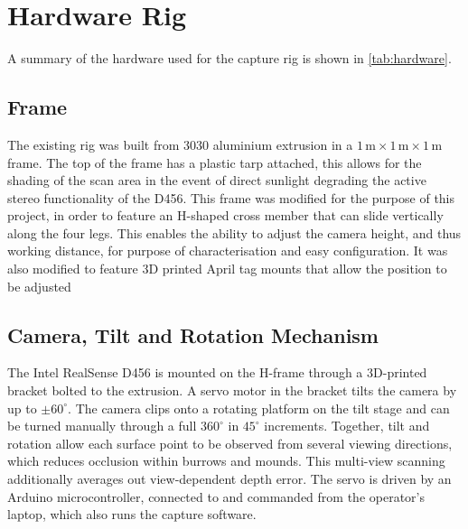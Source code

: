 \section{Hardware Rig}
\label{sec:4.3-Hardware-Rig}
A summary of the hardware used for the capture rig is shown in \autoref{tab:hardware}.
\subsection{Frame}

The existing rig was built from 3030 aluminium extrusion in a $1\,\mathrm{m}\times1\,\mathrm{m}\times1\,\mathrm{m}$ frame. The top of the frame has a plastic tarp attached, this allows for the shading of the scan area in the event of direct sunlight degrading the active stereo functionality of the D456. This frame was modified for the purpose of this project, in order to feature an H-shaped cross member that can slide vertically along the four legs. This enables the ability to adjust the camera height, and thus working distance, for purpose of characterisation and easy configuration. It was also modified to feature 3D printed April tag mounts that allow the position to be adjusted  

\subsection{Camera, Tilt and Rotation Mechanism}
The Intel RealSense D456 is mounted on the H-frame through a 3D-printed bracket bolted to the extrusion. A servo motor in the bracket tilts the camera by up to $\pm60^{\circ}$. The camera clips onto a rotating platform on the tilt stage and can be turned manually through a full $360^{\circ}$ in $45^{\circ}$ increments. Together, tilt and rotation allow each surface point to be observed from several viewing directions, which reduces occlusion within burrows and mounds. This multi-view scanning additionally averages out view-dependent depth error. The servo is driven by an Arduino microcontroller, connected to and commanded from the operator's laptop, which also runs the capture software.

